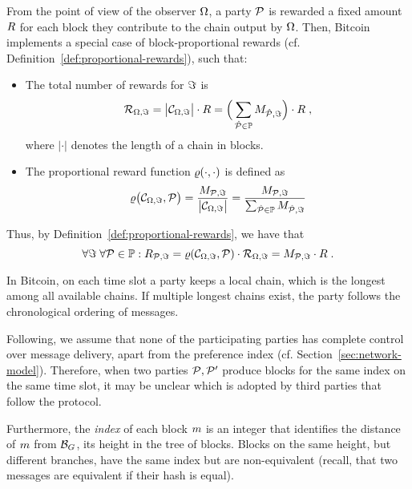 From the point of view of the observer $\Omega$, a party $\mathcal{P}$ is rewarded a
fixed amount $R$ for each block they contribute to the chain output by
$\Omega$.
Then, Bitcoin implements a special case of block-proportional rewards (cf.
Definition~\ref{def:proportional-rewards}), such that:
\begin{itemize}
    \item The total number of rewards for $\Im$ is
        \[\mathcal{R}_{\Omega,\Im} = \big|\mathcal{C}_{\Omega,\Im}\big| \cdot R=\Big(\sum_{\hat{\mathcal{P}} \in \mathbb{P}} M_{\hat{\mathcal{P}},\Im}\Big)\cdot R\;,\]
        where $|\cdot|$ denotes the length of a chain in blocks.
    \item The proportional reward function $\varrho(\cdot,\cdot)$ is defined as
        \[\varrho\big(\mathcal{C}_{\Omega,\Im}, \mathcal{P}\big) =\frac{M_{\mathcal{P},\Im}}{\big|\mathcal{C}_{\Omega,\Im}\big|}=\frac{M_{\mathcal{P},\Im}}{\sum_{\hat{\mathcal{P}} \in \mathbb{P}} M_{\hat{\mathcal{P}},\Im}}\]
\end{itemize}
\noindent Thus, by Definition~\ref{def:proportional-rewards}, we have that
\begin{equation}\label{eq:bitcoin_reward}
    \forall \Im \; \forall \mathcal{P} \in \mathbb{P}: R_{\mathcal{P}, \Im} = \varrho(\mathcal{C}_{\Omega,\Im}, \mathcal{P}) \cdot \mathcal{R}_{\Omega,\Im}=M_{\mathcal{P},\Im}\cdot R\;.
\end{equation}

In Bitcoin, on each time slot a party keeps a local chain,
which is the longest among all available chains. If multiple longest chains
exist, the party follows the chronological ordering of messages.

Following, we assume that none of the participating parties has complete control
over message delivery, \ie apart from the preference index (cf. Section~\ref{sec:network-model}). Therefore, when two parties $\mathcal{P}, \mathcal{P}'$
produce blocks for the same index on the same time slot, it may be unclear
which is adopted by third parties that follow the protocol.

Furthermore, the \emph{index} of each block $m$ is an integer that identifies
the distance of $m$ from $\mathcal{B}_G$, \ie its height in the tree of
blocks. Blocks on the same height, but different branches, have the same
index but are non-equivalent (recall, that two messages are equivalent if their
hash is equal).

